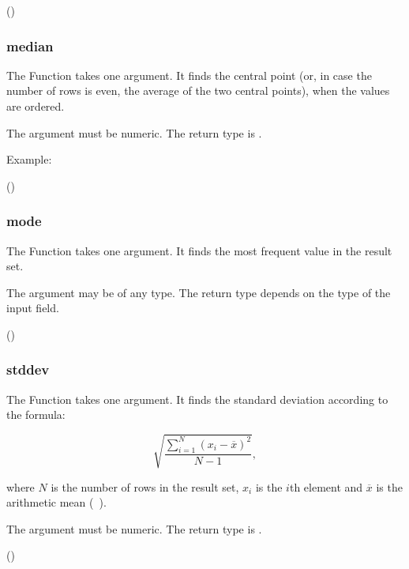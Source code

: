  ()
 

\subsubsection{median}
The Function takes one argument.
It finds the central point (or, in case
the number of rows is even, the average
of the two central points), when the values are ordered.

The argument must be numeric.
The return type is .

Example:

 ()
 


\subsubsection{mode}
The Function takes one argument.
It finds the most frequent value in the result set.

The argument may be of any type.
The return type depends on the type of the input field.

 ()
 


\subsubsection{stddev}
The Function takes one argument.
It finds the standard deviation according to the formula:

\[
\sqrt{\frac{\sum_{i=1}^{N}{(x_i - \overline{x})^2}}{N-1}},
\]

where $N$ is the number of rows in the result set,
$x_i$ is the $i$th element and $\overline{x}$ is
the arithmetic mean (\ie\ ).

The argument must be numeric.
The return type is .

 ()
 


